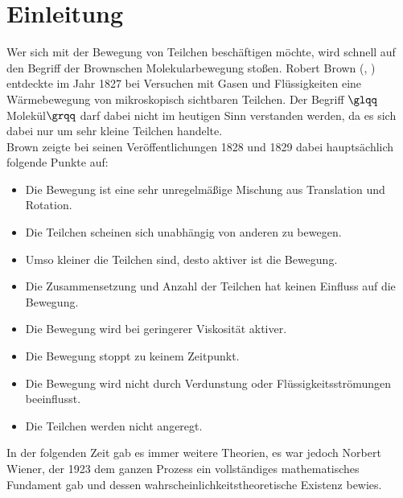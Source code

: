 \documentclass[12pt,a4paper]{scrartcl}
\numberwithin{equation}{section}
\numberwithin{equation}{section}%
\theoremstyle{definition}
\begin{document}
\section{Einleitung}
Wer sich mit der Bewegung von Teilchen beschäftigen möchte, wird schnell auf den Begriff der Brownschen Molekularbewegung stoßen.
Robert Brown (, ) entdeckte im Jahr 1827 bei Versuchen mit Gasen und Flüssigkeiten eine Wärmebewegung von mikroskopisch sichtbaren Teilchen. Der Begriff $\glqq$Molekül$\grqq$ darf dabei nicht im heutigen Sinn verstanden werden, da es sich dabei nur um sehr kleine Teilchen handelte.\\
Brown zeigte bei seinen Veröffentlichungen 1828 und 1829 dabei hauptsächlich folgende Punkte auf:
\begin{itemize}
\item Die Bewegung ist eine sehr unregelmäßige Mischung aus Translation und Rotation.
\item Die Teilchen scheinen sich unabhängig von anderen zu bewegen.
\item Umso kleiner die Teilchen sind, desto aktiver ist die Bewegung.
\item Die Zusammensetzung und Anzahl der Teilchen hat keinen Einfluss auf die Bewegung.
\item Die Bewegung wird bei geringerer Viskosität aktiver.
\item Die Bewegung stoppt zu keinem Zeitpunkt.
\item Die Bewegung wird nicht durch Verdunstung oder Flüssigkeitsströmungen beeinflusst.
\item Die Teilchen werden nicht angeregt.
\end{itemize}

\noindent In der folgenden Zeit gab es immer weitere Theorien, es war jedoch Norbert Wiener, der 1923 dem ganzen Prozess ein vollständiges mathematisches Fundament gab und dessen wahrscheinlichkeitstheoretische Existenz bewies.\\
\end{document}
